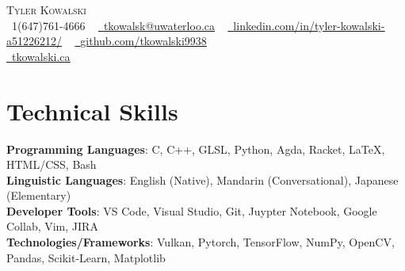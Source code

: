 \documentclass[letterpaper,11pt]{article}
\begin{document}

\begin{center}
    {\Huge \scshape Tyler Kowalski} \\ \vspace{1pt}
    \bigskip 
    \small \raisebox{-0.1\height}\faPhone\ 1(647)761-4666 ~ \href{mailto:tkowalsk@uwaterloo.ca}{\raisebox{-0.2\height}\faEnvelope\  \underline{tkowalsk@uwaterloo.ca}} ~ 
    \href{https://www.linkedin.com/in/tyler-kowalski-a51226212//}{\raisebox{-0.2\height}\faLinkedin\ \underline{linkedin.com/in/tyler-kowalski-a51226212/}}  ~
    \href{https://github.com/tkowalski9938}{\raisebox{-0.2\height}\faGithub\ \underline{github.com/tkowalski9938}}  ~ \\
    \href{https://tkowalski.ca}{\raisebox{-0.2\height}\faGlobe\  \underline{tkowalski.ca}} ~
    \vspace{-8pt}
\end{center}

\section{Technical Skills}
 \begin{itemize}[leftmargin=0.15in, label={}]
    \small{\item{
     \textbf{Programming Languages}{: C, C++, GLSL, Python, Agda, Racket, LaTeX, HTML/CSS, Bash} \\
     \textbf{Linguistic Languages}{: English (Native), Mandarin (Conversational), Japanese (Elementary)} \\
     \textbf{Developer Tools}{: VS Code, Visual Studio, Git, Juypter Notebook, Google Collab, Vim, JIRA} \\
     \textbf{Technologies/Frameworks}{: Vulkan, Pytorch, TensorFlow, NumPy, OpenCV, Pandas, Scikit-Learn, Matplotlib} \\
    }}
 \end{itemize}
 \vspace{-16pt}
\end{document}
